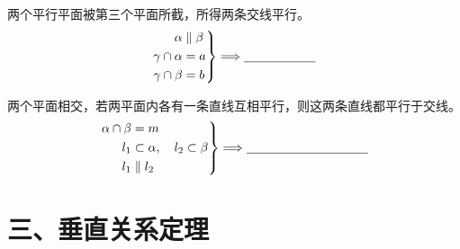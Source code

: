 \documentclass{exam-zh}
\begin{document}
\begin{problem}[points=5]
  \noindent
  \begin{minipage}[t]{\dimexpr\linewidth-55mm-6mm\relax}
    \vspace{0pt}
    两个平行平面被第三个平面所截，所得两条交线平行。
\[
\left.
\begin{aligned}
\alpha&\parallel\beta\\
\gamma\cap\alpha&=a\\
\gamma\cap\beta&=b
\end{aligned}
\right\}
\Longrightarrow
\underline{\hspace{20mm}}
\]


  \end{minipage}\hfill
  \begin{diagramcoltikz}{55mm}{}
  }
  \end{diagramcoltikz}
  \par\medskip
\end{problem}



\begin{problem}[points=5]
  \noindent
  \begin{minipage}[t]{\dimexpr\linewidth-55mm-6mm\relax}
    \vspace{0pt}
    两个平面相交，若两平面内各有一条直线互相平行，则这两条直线都平行于交线。
\[
\left.
\begin{aligned}
\alpha\cap\beta&=m\\
l_1&\subset\alpha,\quad l_2\subset\beta\\
l_1&\parallel l_2
\end{aligned}
\right\}
\Longrightarrow
\underline{\hspace{34mm}}
\]


  \end{minipage}\hfill
  \begin{diagramcoltikz}{55mm}{}
  }
  \end{diagramcoltikz}
  \par\medskip
\end{problem}


\section*{三、垂直关系定理}
\end{document}
